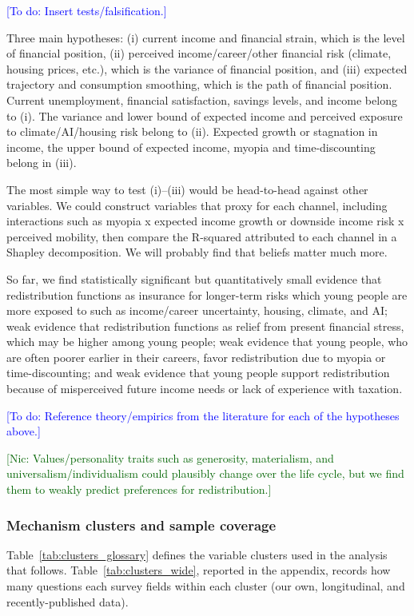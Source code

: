 \documentclass[11pt, headsepline]{article}
\newcommand{\nic}[1]{\noindent\textcolor{darkgreen}{[Nic: #1]}}
\newcommand{\todo}[1]{\noindent\textcolor{blue}{[To do: #1]}}
\begin{document}
\todo{Insert tests/falsification.}

Three main hypotheses: (i) current income and financial strain, which is the level of financial position, (ii) perceived income/career/other financial risk (climate, housing prices, etc.), which is the variance of financial position, and (iii) expected trajectory and consumption smoothing, which is the path of financial position. Current unemployment, financial satisfaction, savings levels, and income belong to (i). The variance and lower bound of expected income and perceived exposure to climate/AI/housing risk belong to (ii). Expected growth or stagnation in income, the upper bound of expected income, myopia and time-discounting belong in (iii). 

The most simple way to test (i)–(iii) would be head-to-head against other variables. We could construct variables that proxy for each channel, including interactions such as myopia x expected income growth or downside income risk x perceived mobility, then compare the R-squared attributed to each channel in a Shapley decomposition. We will probably find that beliefs matter much more. 

So far, we find statistically significant but quantitatively small evidence that redistribution functions as insurance for longer-term risks which young people are more exposed to such as income/career uncertainty, housing, climate, and AI; weak evidence that redistribution functions as relief from present financial stress, which may be higher among young people; weak evidence that young people, who are often poorer earlier in their careers, favor redistribution due to myopia or time-discounting; and weak evidence that young people support redistribution because of misperceived future income needs or lack of experience with taxation.

\todo{Reference theory/empirics from the literature for each of the hypotheses above.}

\nic{Values/personality traits such as generosity, materialism, and universalism/individualism could plausibly change over the life cycle, but we find them to weakly predict preferences for redistribution.}

\newpage
\subsubsection{Mechanism clusters and sample coverage}


Table~\ref{tab:clusters_glossary} defines the variable clusters used in the analysis that follows. Table~\ref{tab:clusters_wide}, reported in the appendix, records how many questions each survey fields within each cluster (our own, longitudinal, and recently-published data).
\end{document}
